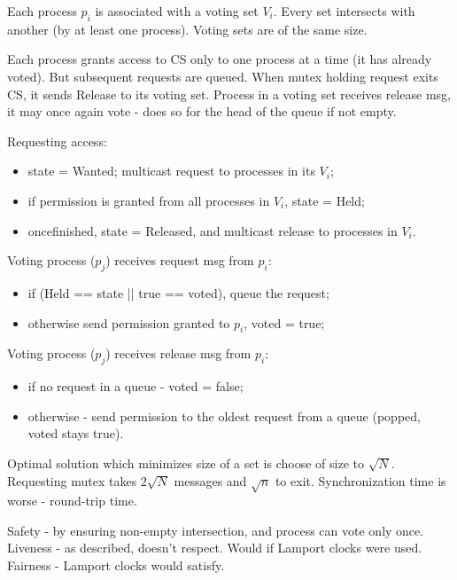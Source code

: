 \documentclass[10pt,a4paper]{article}
\begin{document}
Each process $p_i$ is associated with a voting set $V_i$. Every set intersects with another (by at least one process). Voting sets are of the same size. 

Each process grants access to CS only to one process at a time (it has already voted). But subsequent requests are queued. When mutex holding request exits CS, it sends Release to its voting set. Process in a voting set receives release msg, it may once again vote - does so for the head of the queue if not empty. 

Requesting access:
\begin{itemize}
	\item state = Wanted; multicast request to processes in its $V_i$;
	\item if permission is granted from all processes in $V_i$, state = Held;
	\item oncefinished, state = Released, and multicast release to processes in $V_i$.
\end{itemize}
Voting process ($p_j$) receives request msg from $p_i$:
\begin{itemize}
	\item if (Held == state || true == voted), queue the request;
	\item otherwise send permission granted to $p_i$, voted = true;
\end{itemize}
Voting process ($p_j$) receives release msg from $p_i$:
\begin{itemize}
	\item if no request in a queue - voted = false;
	\item otherwise - send permission to the oldest request from a queue (popped, voted stays true).
\end{itemize}

Optimal solution which minimizes size of a set is choose of size to $\sqrt{N}$. 
Requesting mutex takes $2\sqrt{N}$ messages and $\sqrt{n}$ to exit. Synchronization time is worse - round-trip time.

Safety - by ensuring non-empty intersection, and process can vote only once.
Liveness - as described, doesn't respect. Would if Lamport clocks were used.
Fairness - Lamport clocks would satisfy.
\end{document}
